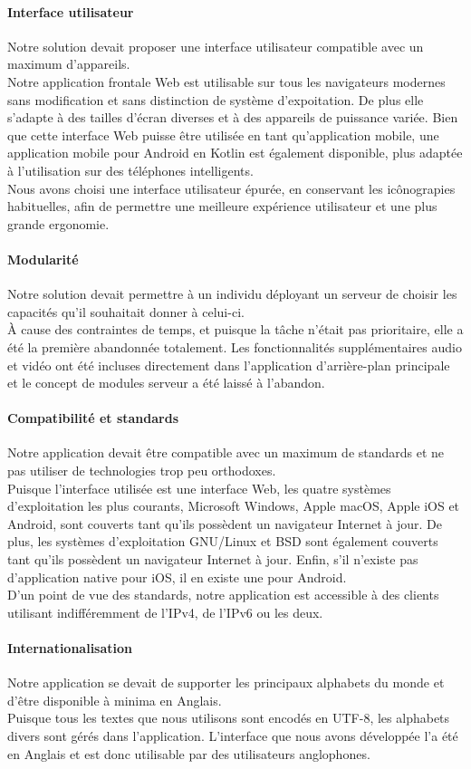 \paragraph{Interface utilisateur} Notre solution devait
proposer une interface utilisateur compatible avec un maximum
d'appareils.\\
Notre application frontale Web est utilisable sur tous les
navigateurs modernes sans modification et sans distinction
de système d'expoitation. De plus elle s'adapte à des tailles
d'écran diverses et à des appareils de puissance variée. Bien
que cette interface Web puisse être utilisée en tant
qu'application mobile, une application mobile pour Android
en Kotlin est également disponible, plus adaptée à
l'utilisation sur des téléphones intelligents.\\
Nous avons choisi une interface utilisateur épurée, en
conservant les icônograpies habituelles, afin de permettre
une meilleure expérience utilisateur et une plus grande
ergonomie.

\paragraph{Modularité} Notre solution devait permettre à un
individu déployant un serveur de choisir les capacités qu'il
souhaitait donner à celui-ci.\\
À cause des contraintes de temps, et puisque la tâche n'était
pas prioritaire, elle a été la première abandonnée totalement.
Les fonctionnalités supplémentaires audio et vidéo ont été
incluses directement dans l'application d'arrière-plan
principale et le concept de modules serveur a été laissé à
l'abandon.

\paragraph{Compatibilité et standards} Notre application
devait être compatible avec un maximum de standards et ne
pas utiliser de technologies trop peu orthodoxes.\\
Puisque l'interface utilisée est une interface Web, les quatre
systèmes d'exploitation les plus courants, Microsoft Windows,
Apple macOS, Apple iOS et Android, sont couverts tant qu'ils
possèdent un navigateur Internet à jour. De plus, les systèmes
d'exploitation GNU/Linux et BSD sont également couverts tant
qu'ils possèdent un navigateur Internet à jour. Enfin, s'il
n'existe pas d'application native pour iOS, il en existe une
pour Android.\\
D'un point de vue des standards, notre application est
accessible à des clients utilisant indifféremment de l'IPv4,
de l'IPv6 ou les deux.

\paragraph{Internationalisation} Notre application se devait
de supporter les principaux alphabets du monde et d'être
disponible à minima en Anglais.\\
Puisque tous les textes que nous utilisons sont encodés en
UTF-8, les alphabets divers sont gérés dans l'application.
L'interface que nous avons développée l'a été en Anglais et
est donc utilisable par des utilisateurs anglophones.
